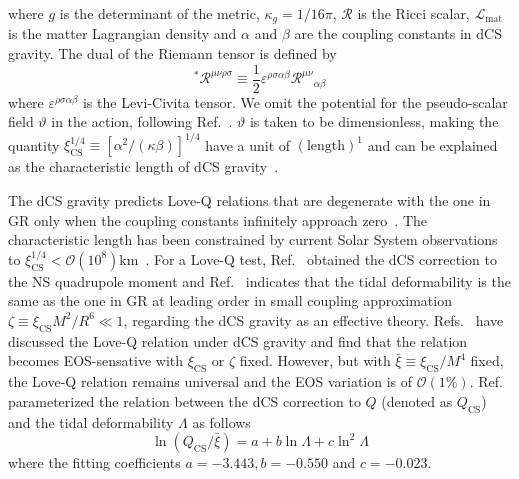 \documentclass[a4paper,11pt]{article}
\newcommand{\ZW}[1]{\textcolor{magenta}{$\mathcal{ZW}$:~#1}}
\begin{document}
where $g$ is the determinant of the metric, $\kappa_g= 1/16\pi$, $\mathcal{R}$ is the Ricci scalar, $\mathcal{L}_{\mathrm{mat}}$ is the matter Lagrangian density and $\alpha$ and $\beta$ are the coupling constants in dCS gravity. The dual of the Riemann tensor is defined by 
\begin{equation}
    \label{dual riemann tensor}
    {}^{*}\mathcal{R}^{\mu\nu\rho\sigma}\equiv\frac{1}{2}\varepsilon^{\rho\sigma\alpha\beta}\mathcal{R}^{\mu\nu}{}_{\alpha\beta}
\end{equation}
where $\varepsilon^{\rho\sigma\alpha\beta}$ is the Levi-Civita tensor. We omit the potential for the pseudo-scalar field $\mathcal{\vartheta}$ in the action, following Ref.~\cite{Gupta:2017vsl}. $\mathcal{\vartheta}$ is taken to be dimensionless, making the quantity $\xi_{\mathrm{CS}}^{1/4} \equiv [\alpha^2/(\kappa\beta)]^{1/4}$ have a unit of $(\text{length})^{1}$ and can be explained as the characteristic length of dCS gravity~\cite{Yunes:2009hc,Yagi:2012ya}. 

The dCS gravity predicts Love-Q relations that are degenerate with the one in GR only when the coupling constants infinitely approach zero~\cite{Yagi:2013bca,Yagi:2013awa,Gupta:2017vsl}. The characteristic length has been constrained by current Solar System observations to $\xi_{\mathrm{CS}}^{1/4}<\mathcal{O}(10^8)$km~\cite{Ali-Haimoud:2011zme,Yagi:2012ya}. For a Love-Q test, Ref.~\cite{Yagi:2013mbt} obtained the dCS correction to the NS quadrupole moment and Ref.~\cite{Yagi:2011xp} indicates that the tidal deformability is the same as the one in GR at leading order in small coupling approximation $\zeta \equiv \xi_{\mathrm{CS}} M^2/R^6 \ll 1$, regarding the dCS gravity as an effective theory. Refs.~\cite{Yagi_2017,Yagi:2013mbt,Gupta:2017vsl} have discussed the Love-Q relation under dCS gravity and find that the relation becomes EOS-sensative with $\xi_{\mathrm{CS}}$ or $\zeta$ fixed. However, but with $\bar{\xi}\equiv \xi_{\mathrm{CS}}/M^4$ fixed, the Love-Q relation remains universal and the EOS variation is of $\mathcal{O}(1\%)$. Ref.~\cite{Gupta:2017vsl} parameterized the relation between the dCS correction to $Q$ (denoted as $Q_{\mathrm{CS}}$) and the tidal deformability $\Lambda$ as follows
\begin{equation}
    \label{cs_Love_Q_eq}
    \ln (Q_{\mathrm{CS}}/\bar{\xi}) = a + b \ln \Lambda + c \ln^{2} \Lambda
\end{equation} 
where the fitting coefficients $a=-3.443, b=-0.550$ and $c=-0.023$. 
\end{document}
